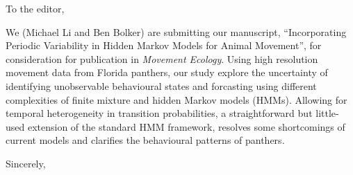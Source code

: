 \documentclass[10pt]{letter}
\begin{document}
\date{\today}

\begin{letter}{
} 

\opening{To the editor,}

We (Michael Li and Ben Bolker) are submitting our manuscript, ``Incorporating Periodic Variability in Hidden Markov Models for Animal Movement'', for consideration for publication in \emph{Movement Ecology}. Using high resolution movement data from Florida panthers, our study explore the uncertainty of identifying unobservable behavioural states and forcasting using different complexities of finite mixture and hidden Markov models (HMMs). Allowing for temporal heterogeneity in transition probabilities, a straightforward 
but little-used extension of the standard HMM framework, 
resolves some shortcomings of current
models and clarifies the behavioural patterns of
panthers. 



\closing{Sincerely,}


\end{letter}
\end{document}
